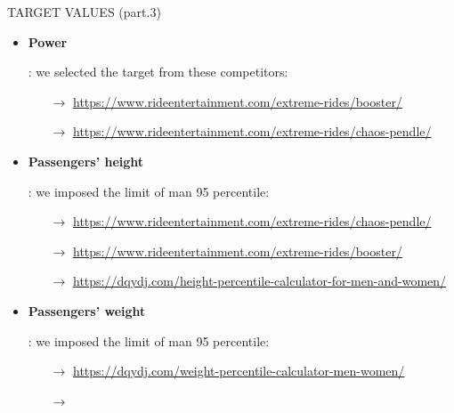 \documentclass{beamer}              %
\begin{document}
	\begin{frame}[fragile]{TARGET VALUES (part.3)}
		\begin{itemize}
			\small
			\item \hypertarget{10}{\textbf{Power}}: we selected the target from these competitors:			
			\begin{itemize}
				\scriptsize
				\item[$\rightarrow$] \url{https://www.rideentertainment.com/extreme-rides/booster/}
				\item[$\rightarrow$] \url{https://www.rideentertainment.com/extreme-rides/chaos-pendle/}
			\end{itemize}
			
			\medskip
			
			\item \hypertarget{8}{\textbf{Passengers' height}}:  we imposed the limit of man 95 percentile:	
			
			\medskip
			
			\begin{itemize}
				\scriptsize
				\item[$\rightarrow$] \url{https://www.rideentertainment.com/extreme-rides/chaos-pendle/}
				\item[$\rightarrow$] \url{https://www.rideentertainment.com/extreme-rides/booster/}
				\item[$\rightarrow$] \url{https://dqydj.com/height-percentile-calculator-for-men-and-women/}
			\end{itemize}
			
			\medskip
			
			\item \hypertarget{9}{\textbf{Passengers' weight}}: we imposed the limit of man 95 percentile:
			\begin{itemize}
				\scriptsize
				\item[$\rightarrow$] \url{https://dqydj.com/weight-percentile-calculator-men-women/}
				\item[$\rightarrow$] 
			\end{itemize}
			
		\end{itemize}
	\end{frame}
\end{document}
